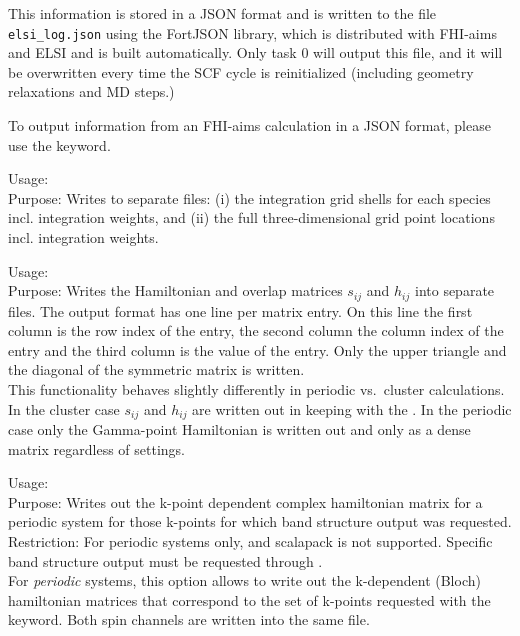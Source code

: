This information is stored in a JSON format and is written to the file
\texttt{elsi\_log.json} using the FortJSON library, which is distributed with
FHI-aims and ELSI and is built automatically.  Only task 0 will output this
file, and it will be overwritten every time the SCF cycle is reinitialized
(including geometry relaxations and MD steps.)

To output information from an FHI-aims calculation in a JSON format, please
use the   keyword.

{
  \noindent
  Usage:   \\[1.0ex]
  Purpose: Writes to separate files: (i) the
     integration grid shells for each
    species incl. integration weights, and (ii) the full
    three-dimensional grid point locations incl. integration weights. \\[1.0ex]
}

{
  \noindent
  Usage:   \\[1.0ex]
  Purpose: Writes the Hamiltonian and overlap matrices $s_{ij}$ and
  $h_{ij}$ into separate files. The output format has one line per
  matrix entry. On this line the first column is the row index of the
  entry, the second column the column index of the entry and the third
  column is the value of the entry. Only the upper triangle and the
  diagonal of the symmetric matrix is written. \\[1.0ex]
  This functionality behaves slightly differently in periodic vs.~cluster
  calculations. In the cluster case $s_{ij}$ and $h_{ij}$ are written
  out in keeping with the . In the
  periodic case only the Gamma-point Hamiltonian is written out and only as
  a dense matrix regardless of  settings.\\[1.0ex]
}

{
  \noindent
  Usage:   \\[1.0ex]
  Purpose: Writes out the k-point dependent complex hamiltonian matrix
    for a periodic system for those k-points for which band structure
    output was requested. \\[1.0ex]
  Restriction: For periodic systems only, and scalapack is not
  supported. Specific band structure output must be requested through
   . \\[1.0ex]
}
For \emph{periodic} systems, this option allows to write out the
k-dependent (Bloch) hamiltonian matrices that correspond to the set of
k-points requested with the  
keyword. Both spin channels are written into the same file.

